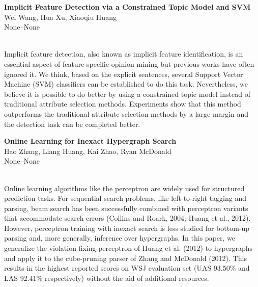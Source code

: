 \documentclass[twoside,makeidx]{book}
\renewcommand{\normalsize}{\fontsize{8}{9}\selectfont}
\renewcommand{\small}{\fontsize{7}{8}\selectfont}
\begin{document}
\par\vspace{2em}\noindent%
\begin{minipage}{\linewidth}%
\begin{center}
\textbf{\normalsize Implicit Feature Detection via a Constrained Topic Model and SVM}\\
\normalsize  Wei Wang,  Hua Xu,  Xiaoqiu Huang\\
{\small None--None}\\
\end{center}
\end{minipage}\\[0.5em]
\nopagebreak%
\noindent%
{\small Implicit feature detection, also known as implicit feature identification, is an essential aspect of feature-specific opinion mining but previous works have often ignored it. We think, based on the explicit sentences, several Support Vector Machine (SVM) classifiers can be established to do this task. Nevertheless, we believe it is possible to do better by using a constrained topic model instead of traditional attribute selection methods. Experiments show that this method outperforms the traditional attribute selection methods by a large margin and the detection task can be completed better.}
\par\vspace{2em}\noindent%
\begin{minipage}{\linewidth}%
\begin{center}
\textbf{\normalsize Online Learning for Inexact Hypergraph Search}\\
\normalsize  Hao Zhang,  Liang Huang,  Kai Zhao,  Ryan McDonald\\
{\small None--None}\\
\end{center}
\end{minipage}\\[0.5em]
\nopagebreak%
\noindent%
{\small Online learning algorithms like the perceptron are widely used for structured prediction tasks. For sequential search problems, like left-to-right tagging and parsing, beam search has been successfully combined with perceptron variants that accommodate search errors (Collins and Roark, 2004; Huang et al., 2012). However, perceptron training with inexact search is less studied for bottom-up parsing and, more generally, inference over hypergraphs. In this paper, we generalize the violation-fixing perceptron of Huang et al. (2012) to hypergraphs and apply it to the cube-pruning parser of Zhang and McDonald (2012). This results in the highest reported scores on WSJ evaluation set (UAS 93.50\% and LAS 92.41\% respectively) without the aid of additional resources.}
\clearpage
\end{document}
